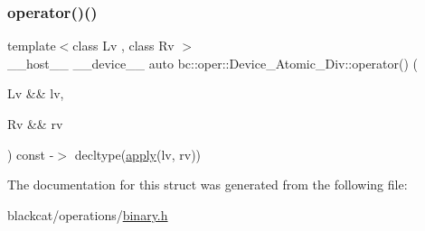 \mbox{\label{structbc_1_1oper_1_1Device__Atomic__Div_a66864c43f3c616c7e01de23316e91ced}} 
\subsubsection{\texorpdfstring{operator()()}{operator()()}}
{\footnotesize\ttfamily template$<$class Lv , class Rv $>$ \\
\+\_\+\+\_\+host\+\_\+\+\_\+ \+\_\+\+\_\+device\+\_\+\+\_\+ auto bc\+::oper\+::\+Device\+\_\+\+Atomic\+\_\+\+Div\+::operator() (\begin{DoxyParamCaption}\item[{Lv \&\&}]{lv,  }\item[{Rv \&\&}]{rv }\end{DoxyParamCaption}) const -\/$>$ decltype(\hyperlink{structbc_1_1oper_1_1Device__Atomic__Div_a0cc2573258790f557f37f80bd3a95133}{apply}(lv, rv)) \hspace{0.3cm}{\ttfamily [inline]}}



The documentation for this struct was generated from the following file\+:\begin{DoxyCompactItemize}
\item 
blackcat/operations/\hyperlink{binary_8h}{binary.\+h}\end{DoxyCompactItemize}
